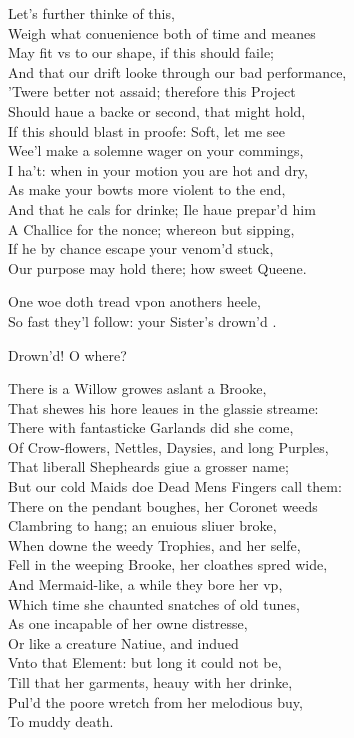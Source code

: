 \documentclass[a5paper,DIV=calc,11pt]{scrbook}
\begin{document}
\begin{drama*}
    \kingspeaks Let's further thinke of this,\\
    Weigh what conuenience both of time and meanes\\
    May fit vs to our shape, if this should faile;\\
    And that our drift looke through our bad performance,\\
    'Twere better not assaid; therefore this Project\\
    Should haue a backe or second, that might hold,\\
    If this should blast in proofe: Soft, let me see\\
    Wee'l make a solemne wager on your commings,\\
    I ha't: when in your motion you are hot and dry,\\
    As make your bowts more violent to the end,\\
    And that he cals for drinke; Ile haue prepar'd him\\
    A Challice for the nonce; whereon but sipping,\\
    If he by chance escape your venom'd stuck,\\
    Our purpose may hold there; how sweet Queene.
    
    
    \queenspeaks One woe doth tread vpon anothers heele,\\
    So fast they'l follow: your Sister's drown'd \laer.
    
    \laerspeaks Drown'd! O where?
    
    \queenspeaks There is a Willow growes aslant a Brooke,\\
    That shewes his hore leaues in the glassie streame:\\
    There with fantasticke Garlands did she come,\\
    Of Crow-flowers, Nettles, Daysies, and long Purples,\\
    That liberall Shepheards giue a grosser name;\\
    But our cold Maids doe Dead Mens Fingers call them:\\
    There on the pendant boughes, her Coronet weeds\\
    Clambring to hang; an enuious sliuer broke,\\
    When downe the weedy Trophies, and her selfe,\\
    Fell in the weeping Brooke, her cloathes spred wide,\\
    And Mermaid-like, a while they bore her vp,\\
    Which time she chaunted snatches of old tunes,\\
    As one incapable of her owne distresse,\\
    Or like a creature Natiue, and indued\\
    Vnto that Element: but long it could not be,\\
    Till that her garments, heauy with her drinke,\\
    Pul'd the poore wretch from her melodious buy,\\
    To muddy death.
    

\end{drama*}
\end{document}
